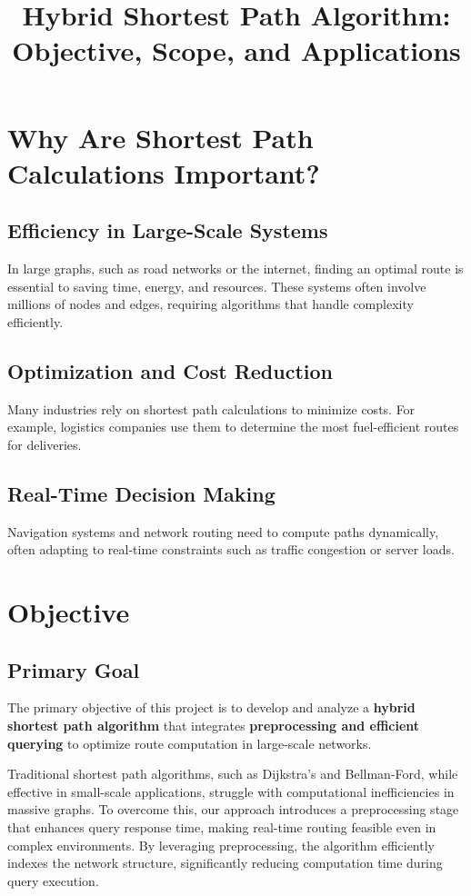 \documentclass{article}
\title{Hybrid Shortest Path Algorithm: Objective, Scope, and Applications}
\author{}
\date{}
\begin{document}
	
	\maketitle
	
	\section{Why Are Shortest Path Calculations Important?}
	
	\subsection{Efficiency in Large-Scale Systems}
	In large graphs, such as road networks or the internet, finding an optimal route is essential to saving time, energy, and resources. These systems often involve millions of nodes and edges, requiring algorithms that handle complexity efficiently.
	
	\subsection{Optimization and Cost Reduction}
	Many industries rely on shortest path calculations to minimize costs. For example, logistics companies use them to determine the most fuel-efficient routes for deliveries.
	
	\subsection{Real-Time Decision Making}
	Navigation systems and network routing need to compute paths dynamically, often adapting to real-time constraints such as traffic congestion or server loads.
	

	
	\section{Objective}
	
	\subsection{Primary Goal}
	The primary objective of this project is to develop and analyze a \textbf{hybrid shortest path algorithm} that integrates \textbf{preprocessing and efficient querying} to optimize route computation in large-scale networks. 
	
	Traditional shortest path algorithms, such as Dijkstra’s and Bellman-Ford, while effective in small-scale applications, struggle with computational inefficiencies in massive graphs. To overcome this, our approach introduces a preprocessing stage that enhances query response time, making real-time routing feasible even in complex environments. By leveraging preprocessing, the algorithm efficiently indexes the network structure, significantly reducing computation time during query execution.
	
\end{document}
